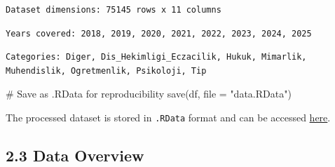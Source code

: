 \documentclass[
  11pt,
  a4paper,
  DIV=11,
  numbers=noendperiod]{scrartcl}
\newenvironment{Shaded}{\begin{snugshade}}{\end{snugshade}}
\newcommand{\AttributeTok}[1]{\textcolor[rgb]{0.40,0.45,0.13}{#1}}
\newcommand{\CommentTok}[1]{\textcolor[rgb]{0.37,0.37,0.37}{#1}}
\newcommand{\FunctionTok}[1]{\textcolor[rgb]{0.28,0.35,0.67}{#1}}
\newcommand{\NormalTok}[1]{\textcolor[rgb]{0.00,0.23,0.31}{#1}}
\newcommand{\SpecialCharTok}[1]{\textcolor[rgb]{0.37,0.37,0.37}{#1}}
\newcommand{\StringTok}[1]{\textcolor[rgb]{0.13,0.47,0.30}{#1}}
\begin{document}
\begin{verbatim}
Dataset dimensions: 75145 rows x 11 columns
\end{verbatim}

\begin{Shaded}
\end{Shaded}

\begin{verbatim}
Years covered: 2018, 2019, 2020, 2021, 2022, 2023, 2024, 2025 
\end{verbatim}

\begin{Shaded}
\end{Shaded}

\begin{verbatim}
Categories: Diger, Dis_Hekimligi_Eczacilik, Hukuk, Mimarlik, Muhendislik, Ogretmenlik, Psikoloji, Tip 
\end{verbatim}

\begin{Shaded}
\begin{Highlighting}[]
\CommentTok{\# Save as .RData for reproducibility}
\FunctionTok{save}\NormalTok{(df, }\AttributeTok{file =} \StringTok{"data.RData"}\NormalTok{)}
\end{Highlighting}
\end{Shaded}

The processed dataset is stored in \texttt{.RData} format and can be
accessed \href{data.RData}{here}.

\subsection{2.3 Data Overview}\label{data-overview}
\end{document}

